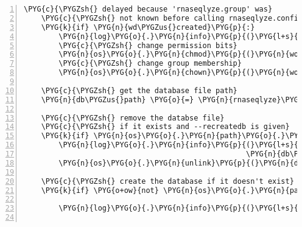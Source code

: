 \begin{Verbatim}[commandchars=\\\{\},numbers=left,firstnumber=1,stepnumber=5]
    \PYG{c}{\PYGZsh{} delayed because 'rnaseqlyze.group' was}
    \PYG{c}{\PYGZsh{} not known before calling rnaseqlyze.configure() above}
    \PYG{k}{if} \PYG{n}{wd\PYGZus{}created}\PYG{p}{:}
        \PYG{n}{log}\PYG{o}{.}\PYG{n}{info}\PYG{p}{(}\PYG{l+s}{"}\PYG{l+s}{adjusting permissions on }\PYG{l+s}{'}\PYG{l+s+si}{\PYGZpc{}s}\PYG{l+s}{'}\PYG{l+s}{"} \PYG{o}{\PYGZpc{}} \PYG{n}{workdir}\PYG{p}{)}
        \PYG{c}{\PYGZsh{} change permission bits}
        \PYG{n}{os}\PYG{o}{.}\PYG{n}{chmod}\PYG{p}{(}\PYG{n}{workdir}\PYG{p}{,} \PYG{l+m+mo}{0775}\PYG{p}{)}
        \PYG{c}{\PYGZsh{} change group membership}
        \PYG{n}{os}\PYG{o}{.}\PYG{n}{chown}\PYG{p}{(}\PYG{n}{workdir}\PYG{p}{,} \PYG{o}{-}\PYG{l+m+mi}{1}\PYG{p}{,} \PYG{n}{grp}\PYG{o}{.}\PYG{n}{getgrnam}\PYG{p}{(}\PYG{n}{rnaseqlyze}\PYG{o}{.}\PYG{n}{group}\PYG{p}{)}\PYG{o}{.}\PYG{n}{gr\PYGZus{}gid}\PYG{p}{)}

    \PYG{c}{\PYGZsh{} get the database file path}
    \PYG{n}{db\PYGZus{}path} \PYG{o}{=} \PYG{n}{rnaseqlyze}\PYG{o}{.}\PYG{n}{db\PYGZus{}url}\PYG{o}{.}\PYG{n}{split}\PYG{p}{(}\PYG{l+s}{"}\PYG{l+s}{:}\PYG{l+s}{"}\PYG{p}{,} \PYG{l+m+mi}{1}\PYG{p}{)}\PYG{p}{[}\PYG{l+m+mi}{1}\PYG{p}{]}

    \PYG{c}{\PYGZsh{} remove the databse file}
    \PYG{c}{\PYGZsh{} if it exists and --recreatedb is given}
    \PYG{k}{if} \PYG{n}{os}\PYG{o}{.}\PYG{n}{path}\PYG{o}{.}\PYG{n}{exists}\PYG{p}{(}\PYG{n}{db\PYGZus{}path}\PYG{p}{)} \PYG{o+ow}{and} \PYG{n}{opts}\PYG{p}{[}\PYG{l+s}{'}\PYG{l+s}{--recreatedb}\PYG{l+s}{'}\PYG{p}{]}\PYG{p}{:}
        \PYG{n}{log}\PYG{o}{.}\PYG{n}{info}\PYG{p}{(}\PYG{l+s}{"}\PYG{l+s}{removing existing database file }\PYG{l+s}{'}\PYG{l+s+si}{\PYGZpc{}s}\PYG{l+s}{'}\PYG{l+s}{"} \PYG{o}{\PYGZpc{}}
                                                   \PYG{n}{db\PYGZus{}path}\PYG{o}{.}\PYG{n}{split}\PYG{p}{(}\PYG{l+s}{'}\PYG{l+s}{/}\PYG{l+s}{'}\PYG{p}{)}\PYG{p}{[}\PYG{o}{-}\PYG{l+m+mi}{1}\PYG{p}{]}\PYG{p}{)}
        \PYG{n}{os}\PYG{o}{.}\PYG{n}{unlink}\PYG{p}{(}\PYG{n}{db\PYGZus{}path}\PYG{p}{)}

    \PYG{c}{\PYGZsh{} create the database if it doesn't exist}
    \PYG{k}{if} \PYG{o+ow}{not} \PYG{n}{os}\PYG{o}{.}\PYG{n}{path}\PYG{o}{.}\PYG{n}{exists}\PYG{p}{(}\PYG{n}{db\PYGZus{}path}\PYG{p}{)}\PYG{p}{:}

        \PYG{n}{log}\PYG{o}{.}\PYG{n}{info}\PYG{p}{(}\PYG{l+s}{"}\PYG{l+s}{recreating database }\PYG{l+s}{'}\PYG{l+s+si}{\PYGZpc{}s}\PYG{l+s}{'}\PYG{l+s}{"} \PYG{o}{\PYGZpc{}} \PYG{n}{rnaseqlyze}\PYG{o}{.}\PYG{n}{db\PYGZus{}url}\PYG{p}{)}


\end{Verbatim}
